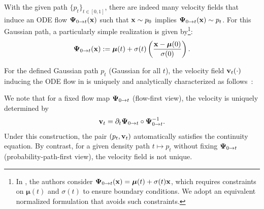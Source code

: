 With the given path $\{p_t\}_{t \in [0,1]}$, there are indeed many velocity fields that induce an ODE flow $\bm{\Psi}_{0\to t}({\mathbf{x}})$ such that ${\mathbf{x}} \sim p_0$ implies $\bm{\Psi}_{0\to t}({\mathbf{x}}) \sim p_t$. For this Gaussian path, a particularly simple realization is given by\footnote{In \citep{lipman2022flow}, the authors consider $\bm{\Psi}_{0\to t}({\mathbf{x}}) = \bm{\mu}(t) + \sigma(t){\mathbf{x}}$, which requires constraints on $\bm{\mu}(t)$ and $\sigma(t)$ to ensure boundary conditions. We adopt an equivalent normalized formulation that avoids such constraints.}:
\begin{align}\label{eq:gaussian-sol-map}
    \bm{\Psi}_{0\to t}({\mathbf{x}}) := \bm{\mu}(t) + \sigma(t) \left( \frac{{\mathbf{x}} - \bm{\mu}(0)}{\sigma(0)} \right).
\end{align}

For the defined Gaussian path $p_t$ (Gaussian for all $t$), the velocity field ${\mathbf{v}}_t(\cdot)$ inducing the ODE flow in  is uniquely and analytically characterized as follows~\citep{lipman2022flow}:

We note that for a fixed flow map ${\bm{\Psi}}_{0\to t}$ (flow-first view), the velocity is uniquely determined by
\[
{\mathbf{v}}_t  =  \partial_t {\bm{\Psi}}_{0\to t} \circ {\bm{\Psi}}_{0\to t}^{-1}.
\]
Under this construction, the pair $(p_t,{\mathbf{v}}_t)$ automatically satisfies the continuity equation.
By contrast, for a given density path $t\mapsto p_t$ without fixing ${\bm{\Psi}}_{0\to t}$ (probability-path-first view),
the velocity field is not unique.

